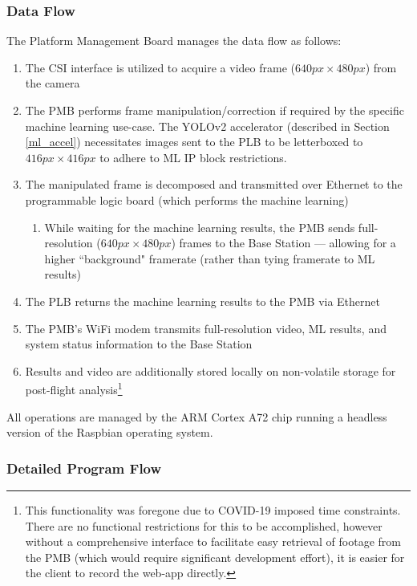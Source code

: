 \subsubsection{Data Flow}
\label{pmb_dataflow}
The Platform Management Board manages the data flow as follows:
\begin{enumerate}
\item The CSI interface is utilized to acquire a video frame ($640px \times 480px$) from the camera
\item The PMB performs frame manipulation/correction if required by the specific machine learning use-case. The YOLOv2 accelerator (described in Section \ref{ml_accel}) necessitates images sent to the PLB to be letterboxed to $416px \times 416px$ to adhere to ML IP block restrictions.
\item The manipulated frame is decomposed and transmitted over Ethernet to the programmable logic board (which performs the machine learning)
\begin{enumerate}
\item While waiting for the machine learning results, the PMB sends full-resolution ($640px \times 480px$) frames to the Base Station --- allowing for a higher ``background" framerate (rather than tying framerate to ML results)
\end{enumerate}
\item The PLB returns the machine learning results to the PMB via Ethernet
\item The PMB's WiFi modem transmits full-resolution video, ML results, and system status information to the Base Station
\item Results and video are additionally stored locally on non-volatile storage for post-flight analysis\footnote{This functionality was foregone due to COVID-19 imposed time constraints. There are no functional restrictions for this to be accomplished, however without a comprehensive interface to facilitate easy retrieval of footage from the PMB (which would require significant development effort), it is easier for the client to record the web-app directly.}
\end{enumerate}

All operations are managed by the ARM Cortex A72 chip running a headless version of the Raspbian operating system. 

\subsubsection{Detailed Program Flow}

